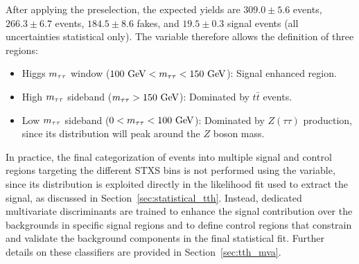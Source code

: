 After applying the preselection, the expected yields are $309.0 \pm 5.6$ \ztautau events, $266.3 \pm 6.7$ \ttbar events, $184.5 \pm 8.6$ fakes, and $19.5 \pm 0.3$ \ttHtt signal events (all uncertainties statistical only). The \mtt variable therefore allows the definition of three regions:
\begin{itemize}
    \small
    \item Higgs $m_{\tau\tau}$ window ($100~\text{GeV} < m_{\tau\tau} < 150~\text{GeV}$): Signal enhanced region.
    \item High $m_{\tau\tau}$ sideband ($m_{\tau\tau} > 150~\text{GeV}$): Dominated by $t\bar{t}$ events.
    \item Low $m_{\tau\tau}$ sideband ($0 < m_{\tau\tau} < 100~\text{GeV}$): Dominated by $Z(\tau\tau)$ production, since its distribution will peak around the $Z$ boson mass.
\end{itemize}

In practice, the final categorization of events into multiple signal and control regions targeting the different STXS bins is not performed using the \mtt variable, since its distribution is exploited directly in the likelihood fit used to extract the signal, as discussed in Section~\ref{sec:statistical_tth}. 
Instead, dedicated multivariate discriminants are trained to enhance the signal contribution over the backgrounds in specific signal regions and to define control regions that constrain and validate the background components in the final statistical fit. 
Further details on these classifiers are provided in Section~\ref{sec:tth_mva}.  


